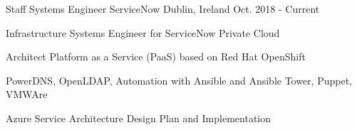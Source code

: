 

\begin{cventries}

  \cventry
    {Staff Systems Engineer} %
    {ServiceNow} %
    {Dublin, Ireland} %
    {Oct. 2018 - Current} %
    {
      \begin{cvitems} %
        \item {Infrastructure Systems Engineer for ServiceNow Private Cloud }
        \item { Architect Platform as a Service (PaaS) based on Red Hat OpenShift }
        \item { PowerDNS, OpenLDAP, Automation with Ansible and Ansible Tower, Puppet, VMWAre }
        \item {Azure Service Architecture Design Plan and Implementation }
      \end{cvitems}
    }


\end{cventries}
